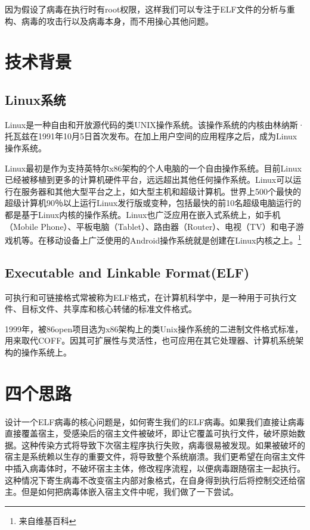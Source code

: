 \documentclass[a4paper, 11pt]{article}
\begin{document}
	因为假设了病毒在执行时有root权限，这样我们可以专注于ELF文件的分析与重构、病毒的攻击行以及病毒本身，而不用操心其他问题。
\section{技术背景}
\subsection{Linux系统}
Linux是一种自由和开放源代码的类UNIX操作系统。该操作系统的内核由林纳斯·托瓦兹在1991年10月5日首次发布。在加上用户空间的应用程序之后，成为Linux操作系统。

Linux最初是作为支持英特尔x86架构的个人电脑的一个自由操作系统。目前Linux已经被移植到更多的计算机硬件平台，远远超出其他任何操作系统。Linux可以运行在服务器和其他大型平台之上，如大型主机和超级计算机。世界上500个最快的超级计算机90％以上运行Linux发行版或变种，包括最快的前10名超级电脑运行的都是基于Linux内核的操作系统。Linux也广泛应用在嵌入式系统上，如手机（Mobile Phone）、平板电脑（Tablet）、路由器（Router）、电视（TV）和电子游戏机等。在移动设备上广泛使用的Android操作系统就是创建在Linux内核之上。\footnote{来自维基百科}
\subsection{Executable and Linkable Format(ELF)}
可执行和可链接格式常被称为ELF格式，在计算机科学中，是一种用于可执行文件、目标文件、共享库和核心转储的标准文件格式。

1999年，被86open项目选为x86架构上的类Unix操作系统的二进制文件格式标准，用来取代COFF。因其可扩展性与灵活性，也可应用在其它处理器、计算机系统架构的操作系统上。
\section{四个思路}
设计一个ELF病毒的核心问题是，如何寄生我们的ELF病毒。如果我们直接让病毒直接覆盖宿主，受感染后的宿主文件被破坏，即让它覆盖可执行文件，破坏原始数据。这种传染方式将导致下次宿主程序执行失败，病毒很易被发现。如果被破坏的宿主是系统赖以生存的重要文件，将导致整个系统崩溃。我们更希望在向宿主文件中插入病毒体时，不破坏宿主主体，修改程序流程，以便病毒跟随宿主一起执行。这种情况下寄生病毒不改变宿主内部对象格式，在自身得到执行后将控制交还给宿主。但是如何把病毒体嵌入宿主文件中呢，我们做了一下尝试。
\end{document}

